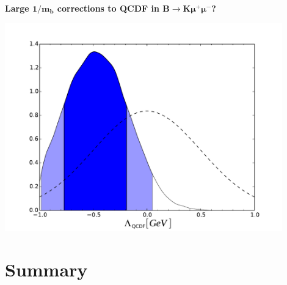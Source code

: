\documentclass[english]{beamer}
\newcommand{\slide}[2][t]{\begin{frame}[#1] \frametitle{\insertsection} #2 \end{frame}}
\begin{document}
\slide{

    \frametitle{\insertsubsectionhead}

    {\large\textbf{Large $\boldsymbol{1/m_b}$ corrections to QCDF in $\boldsymbol{B \rightarrow K \mu^+ \mu^-}$?}}

    \begin{center}
        \includegraphics[width=0.9\textwidth]{figures/SL_large_recoil}
    \end{center}

}

\section{Summary}
\end{document}
